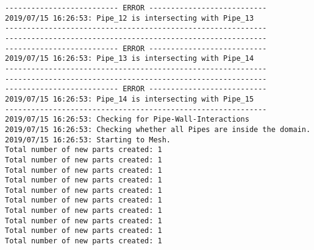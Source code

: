 \documentclass{article}
\begin{document}
{\begin{verbatim}
-------------------------- ERROR ---------------------------
2019/07/15 16:26:53: Pipe_12 is intersecting with Pipe_13
------------------------------------------------------------
------------------------------------------------------------
-------------------------- ERROR ---------------------------
2019/07/15 16:26:53: Pipe_13 is intersecting with Pipe_14
------------------------------------------------------------
------------------------------------------------------------
-------------------------- ERROR ---------------------------
2019/07/15 16:26:53: Pipe_14 is intersecting with Pipe_15
------------------------------------------------------------
2019/07/15 16:26:53: Checking for Pipe-Wall-Interactions
2019/07/15 16:26:53: Checking whether all Pipes are inside the domain.
2019/07/15 16:26:53: Starting to Mesh.
Total number of new parts created: 1
Total number of new parts created: 1
Total number of new parts created: 1
Total number of new parts created: 1
Total number of new parts created: 1
Total number of new parts created: 1
Total number of new parts created: 1
Total number of new parts created: 1
Total number of new parts created: 1
Total number of new parts created: 1
\end{verbatim}
}
\clearpage
\end{document}
